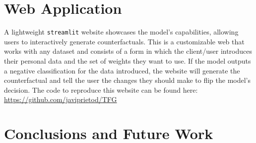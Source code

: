 \documentclass[12pt]{extarticle}
\numberwithin{equation}{section}
\begin{document}


\section*{Web Application}
A lightweight \texttt{streamlit} website showcases the model's capabilities, allowing users to interactively generate counterfactuals. This is a customizable web that works with any dataset and consists of a form in which the client/user introduces their personal data and the set of weights they want to use. If the model outputs a negative classification for the data introduced, the website will generate the counterfactual and tell the user the changes they should make to flip the model's decision. The code to reproduce this website can be found here: \url{https://github.com/javiprietod/TFG}

\section*{Conclusions and Future Work} 

\end{document}
